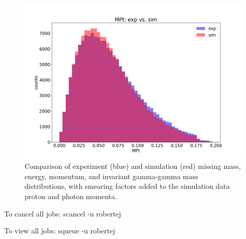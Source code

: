 \begin{figure}[hbt]
	\includegraphics[page=135,width=0.3\linewidth]{Chapters/Ch3-Simulations/pics/yessmear/outbending_rad_All_All_All_for_aps_2022_plots_sangcutsMPt_exp_vs_sim.png}
	
	\caption{Comparison of experiment (blue) and simulation (red) missing mass, energy, momentum, and invariant gamma-gamma mass distributions, with smearing factors added to the simulation data proton and photon momenta.}
	\label{fig:good}
\end{figure}

To cancel all jobs:
scancel -u robertej

To view all jobs:
squeue -u robertej

